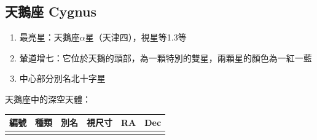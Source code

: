\subsection{天鵝座 Cygnus}
\begin{enumerate}
    \item 最亮星：天鵝座\(\alpha\)星（天津四），視星等1.3等
    \item 輦道增七：它位於天鵝的頭部，為一顆特別的雙星，兩顆星的顏色為一紅一藍
    \item 中心部分別名北十字星
\end{enumerate}
天鵝座中的深空天體：
\newline

\begin{center}
\begin{longtable}{c | c | c | c | c | c}
    編號 & 種類 & 別名 & 視尺寸 & RA & Dec \\
    \hline
    \endfirsthead


    \endfoot

    \endlastfoot


\end{longtable}
\end{center}
